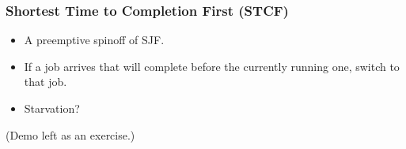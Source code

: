 \begin{frame}

\frametitle{Shortest Time to Completion First (STCF)}

\vspace{\fill}

\begin{itemize}

\item A preemptive spinoff of SJF.

\item If a job arrives that will complete before the currently running one,
switch to that job.

\item Starvation?

\end{itemize}

\vspace{\fill}

\begin{center}

(Demo left as an exercise.)

\end{center}

\vspace{\fill}

\end{frame}
